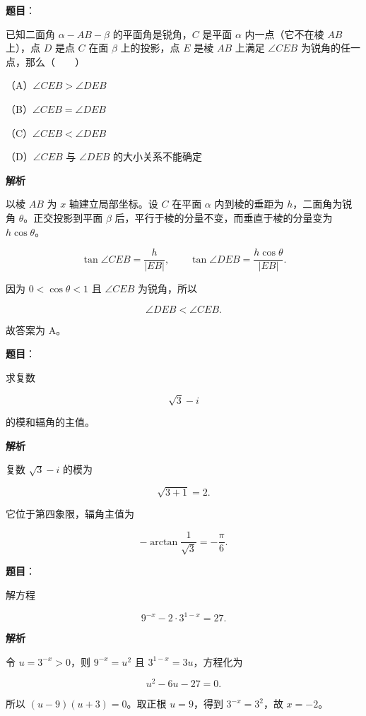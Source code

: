 \begin{answer}

\textbf{题目}：

已知二面角 $\alpha-AB-\beta$ 的平面角是锐角，$C$ 是平面 $\alpha$ 内一点（它不在棱 $AB$ 上），点 $D$ 是点 $C$ 在面 $\beta$ 上的投影，点 $E$ 是棱 $AB$ 上满足 $\angle CEB$ 为锐角的任一点，那么\mbox{（　　）}

（A）$\angle CEB>\angle DEB$

（B）$\angle CEB=\angle DEB$

（C）$\angle CEB<\angle DEB$

（D）$\angle CEB$ 与 $\angle DEB$ 的大小关系不能确定

\textbf{解析}

以棱 $AB$ 为 $x$ 轴建立局部坐标。设 $C$ 在平面 $\alpha$ 内到棱的垂距为 $h$，二面角为锐角 $\theta$。正交投影到平面 $\beta$ 后，平行于棱的分量不变，而垂直于棱的分量变为 $h\cos\theta$。

\nopagebreak[4]
\[
\tan\angle CEB=\frac{h}{|EB|},
\qquad
\tan\angle DEB=\frac{h\cos\theta}{|EB|}.
\]

因为 $0<\cos\theta<1$ 且 $\angle CEB$ 为锐角，所以

\nopagebreak[4]
\[
\angle DEB<\angle CEB.
\]

故答案为 A。


\end{answer}
\begin{answer}

\textbf{题目}：

求复数

\nopagebreak[4]
\[
\sqrt3-i
\]

的模和辐角的主值。

\textbf{解析}

复数 $\sqrt3-i$ 的模为

\nopagebreak[4]
\[
\sqrt{3+1}=2.
\]

它位于第四象限，辐角主值为

\nopagebreak[4]
\[
-\arctan\frac1{\sqrt3}=-\frac\pi6.
\]


\end{answer}
\begin{answer}

\textbf{题目}：

解方程

\nopagebreak[4]
\[
9^{-x}-2\cdot3^{1-x}=27.
\]

\textbf{解析}

令 $u=3^{-x}>0$，则 $9^{-x}=u^2$ 且 $3^{1-x}=3u$，方程化为

\nopagebreak[4]
\[
u^2-6u-27=0.
\]

所以 $(u-9)(u+3)=0$。取正根 $u=9$，得到 $3^{-x}=3^2$，故 $x=-2$。


\end{answer}
